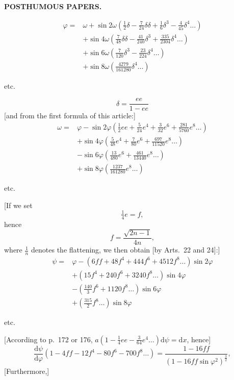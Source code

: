 \par\clearpage
{}\hfill{\small\textbf{POSTHUMOUS PAPERS.}}\hfill\null\par\medskip
\[
\begin{aligned}
\varphi={}&\omega+\sin2\omega(\tfrac12\delta-\tfrac7{24}\delta\delta+\tfrac16\delta^3-\tfrac4{45}\delta^4\ldots)\\
&+\sin4\omega(\tfrac7{48}\delta\delta-\tfrac{41}{240}\delta^3+\tfrac{335}{2304}\delta^4\ldots)\\
&+\sin6\omega(\tfrac7{120}\delta^3-\tfrac{23}{224}\delta^4\ldots)\\
&+\sin8\omega(\tfrac{4279}{161280}\delta^4\ldots)
\end{aligned}
\]
{\centering etc.\par}
\[\delta=\frac{ee}{1-ee}\]
[and from the first formula of this article:]
\[
\begin{aligned}
\omega={}&\varphi-\sin2\varphi(\tfrac12ee+\tfrac5{24}e^4+\tfrac3{32}e^6+\tfrac{281}{5760}e^8\ldots)\\
&+\sin4\varphi(\tfrac5{48}e^4+\tfrac7{80}e^6+\tfrac{697}{11520}e^8\ldots)\\
&-\sin6\varphi(\tfrac{13}{480}e^6+\tfrac{461}{13440}e^8\ldots)\\
&+\sin8\varphi(\tfrac{1237}{161280}e^8\ldots)
\end{aligned}
\]
{\centering etc.\par}
\bigskip
{\centering [25.]\par}
[If we set
\[\tfrac14e=f,\]
\noindent hence
\[f=\frac{\sqrt{2n-1}}{4n},\]
\noindent where \(\frac1n\) denotes the flattening, we then obtain [by Arts.~22 and 24]:]
\[
\begin{aligned}
\psi={}&\varphi-(6ff+48f^4+444f^6+4512f^8\ldots)\sin2\varphi\\
&+(15f^4+240f^6+3240f^8\ldots)\sin4\varphi\\
&-(\tfrac{140}{3}f^6+1120f^8\ldots)\sin6\varphi\\
&+(\tfrac{315}{2}f^8\ldots)\sin8\varphi
\end{aligned}
\]
{\centering etc.\par}
[According to p.~172 or 176, \(a(1-\tfrac14ee-\tfrac3{64}e^4\ldots)\mathrm d\psi=\mathrm dx\), hence]
\[
\frac{\mathrm d\psi}{\mathrm d\varphi}(1-4ff-12f^4-80f^6-700f^8\ldots)=\frac{1-16ff}{(1-16ff\sin\varphi^2)^{\frac32}},
\]
[Furthermore,]

